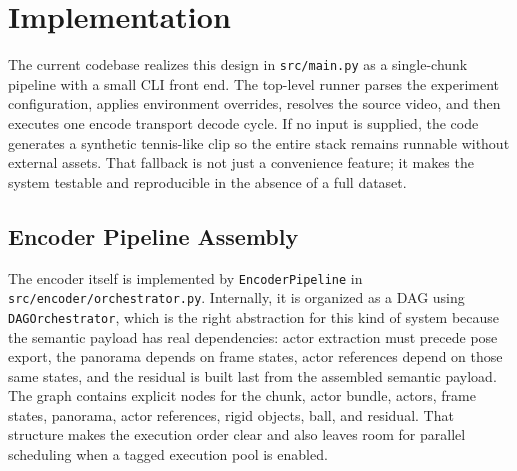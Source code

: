 \documentclass[manuscript, screen]{acmart}
\begin{document}
\section{Implementation}
The current codebase realizes this design in \texttt{src/main.py} as a single-chunk pipeline with a small CLI front end. The top-level runner parses the experiment configuration, applies environment overrides, resolves the source video, and then executes one encode transport decode cycle. If no input is supplied, the code generates a synthetic tennis-like clip so the entire stack remains runnable without external assets. That fallback is not just a convenience feature; it makes the system testable and reproducible in the absence of a full dataset.

\subsection{Encoder Pipeline Assembly}
The encoder itself is implemented by \texttt{EncoderPipeline} in \texttt{src/encoder/orchestrator.py}. Internally, it is organized as a DAG using \texttt{DAGOrchestrator}, which is the right abstraction for this kind of system because the semantic payload has real dependencies: actor extraction must precede pose export, the panorama depends on frame states, actor references depend on those same states, and the residual is built last from the assembled semantic payload. The graph contains explicit nodes for the chunk, actor bundle, actors, frame states, panorama, actor references, rigid objects, ball, and residual. That structure makes the execution order clear and also leaves room for parallel scheduling when a tagged execution pool is enabled.
\end{document}
